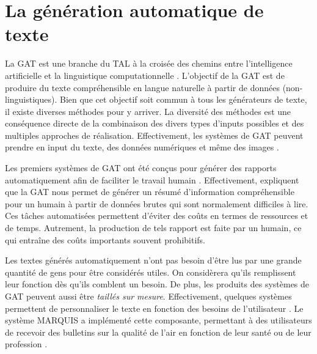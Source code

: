 
\chapter{La génération automatique de texte}


La \acf{GAT} est une branche du \acf{TAL} à la croisée des chemins entre l'intelligence artificielle et la linguistique computationnelle \citep{ReiterBuildingNaturalLanguage2000}. L'objectif de la \ac{GAT} est de produire du texte compréhensible en langue naturelle à partir de données (non-linguistiques). Bien que cet objectif soit commun à tous les générateurs de texte, il existe diverses méthodes pour y arriver. La diversité des méthodes est une conséquence directe de la combinaison des divers types d'inputs possibles et des multiples approches de réalisation. Effectivement, les systèmes de \ac{GAT} peuvent prendre en input du texte, des données numériques et même des images \citep{thomason:coling14}.

Les premiers systèmes de \ac{GAT} ont été conçus pour générer des rapports automatiquement afin de faciliter le travail humain \citep{ReiterBuildingNaturalLanguage2000}. Effectivement, \cite{DaoustJSREALTextRealizer2015} expliquent que la \ac{GAT} nous permet de générer un résumé d'information compréhensible pour un humain à partir de données brutes qui sont normalement difficiles à lire. Ces tâches automatisées permettent d'éviter des coûts en termes de ressources et de temps. Autrement, la production de tels rapport est faite par un humain, ce qui entraîne des coûts importants souvent prohibitifs.

Les textes générés automatiquement n'ont pas besoin d'être lus par une grande quantité de gens pour être considérés utiles. On considèrera qu'ils remplissent leur fonction dès qu'ils comblent un besoin. De plus, les produits des systèmes de \ac{GAT} peuvent aussi être \emph{taillés sur mesure}. Effectivement, quelques systèmes permettent de personnaliser le texte en fonction des besoins de l'utilisateur \citep{1948c0b7a8ca42679cad977bb2cdddc2}. Le système MARQUIS a implémenté cette composante, permettant à des utilisateurs de recevoir des bulletins sur la qualité de l'air en fonction de leur santé ou de leur profession \citep{WannerMARQUISGENERATIONUSERTAILORED2010}.


